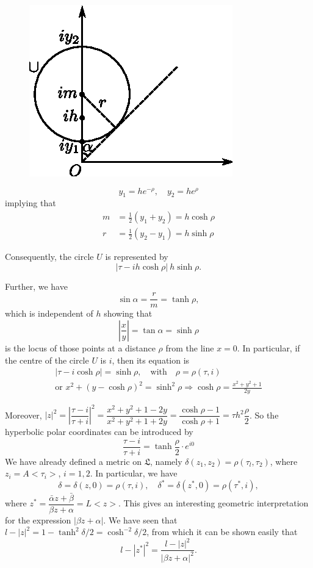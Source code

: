 \begin{figure}[H]
\centering
\includegraphics{vol29-fig/fig29-4.eps}
\smallskip
\caption{}
\label{chap1:fig4}
\end{figure}
$$
y_1 = h e^{-\rho}, \quad y_2 = h e^{\rho}
$$
implying that 
\begin{align*}
m & = \frac{1}{2} (y_1+y_2) = h \cosh \rho \tag{10}\label{eq1:10}\\
r & = \frac{1}{2} (y_2-y_1) = h \sinh \rho \tag{11}\label{eq1:11}
\end{align*}

Consequently, the circle $U$ is represented by
$$
|\tau -ih \cosh \rho| \ h \sinh \rho.
$$\pageoriginale

Further, we have 
\begin{equation*}
\sin \alpha = \frac{r}{m} = \tanh \rho, \tag{12}\label{eq1:12}
\end{equation*}
which is independent of $h$ showing that 
$$
|\frac{x}{y}| = \tan \alpha = \sinh \rho
$$
is the locus of those points at a distance $\rho$ from the line
$x=0$. In particular, if the centre of the circle $U$ is $i$, then its
equation is 
\begin{gather*}
|\tau-i \cosh \rho|= \sinh \rho, \quad \text{with} \quad \rho = \rho
(\tau, i)\\
\text{or } x^2 + (y-\cosh \rho)^2 = \sinh^2 \rho \Longrightarrow \cosh
\rho =\frac{x^2+y^2+1}{2y}
\end{gather*}

Moreover, $|z|^2 = \left|\dfrac{\tau - i}{\tau + i} \right|^2 =
\dfrac{x^2+y^2+ 1 - 2y}{x^2+y^2+1+2y} = \dfrac{\cosh \rho-1}{\cosh
  \rho + 1} = \tau h^2 \dfrac{\rho}{2}$. So the hyperbolic polar
coordinates can be introduced by 
\begin{equation*}
\frac{\tau - i }{\tau + i} = \tanh 
\frac{\rho}{2} \cdot e^{i0} \tag{13}\label{eq1:13}
\end{equation*}
We have already defined a metric on $\mathfrak{L}$, namely $\delta
(z_1, z_2)=\rho(\tau_l, \tau_2)$, where $z_i = A <\tau_i>$, $i = 1,
2$. In particular, we have 
$$
\delta = \delta (z,0) = \rho (\tau, i), \quad \delta^{\ast} = \delta
(z^{\ast},0) = \rho (\tau^{\ast}, i),
$$
where $z^{\ast} = \dfrac{\bar{\alpha} z+ \bar{\beta}}{\beta z +
  \alpha} = L <z>$. This gives an interesting geometric interpretation
for the expression $|\beta z + \alpha|$. We have seen that
$l - |z|^2 = 1 -\tanh^2 \delta/2 = \cosh^{-2} \delta/2$, from which it
can be shown easily that 
$$
l -|z^{\ast}|^2 = \frac{l-|z|^2}{|\beta z + \alpha|^2}. 
$$

